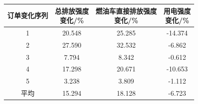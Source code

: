 \begin{tabular}{cccc}
\toprule
订单变化序列 & \makecell[c]{总排放强度\\变化/\%} & \makecell[c]{燃油车直接排放强度\\变化/\%} & \makecell[c]{用电强度\\变化/\%} \\
\midrule
1 & 20.548 & 25.285 & -14.374 \\
2 & 27.590 & 32.532 & -6.862 \\
3 & 7.794 & 8.342 & -0.612 \\
4 & 17.298 & 20.671 & -10.653 \\
5 & 3.238 & 3.809 & -1.112 \\
\midrule
平均 & 15.294 & 18.128 & -6.723 \\
\bottomrule
\end{tabular}
